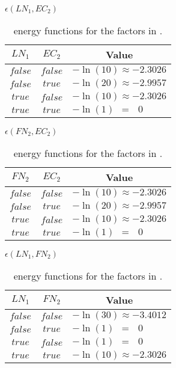 \begin{table}[t]
\begin{minipage}{0.5\linewidth}
\centering
$\epsilon(LN_1,EC_2)$\par
\smallskip
\begin{tabular}{c c l}
 \toprule
 $LN_1$ & $EC_2$ & \multicolumn{1}{c}{Value} \\
 \midrule
 $false$ & $false$ & $-\ln(10)\approx-2.3026$ \\
 $false$ & $true$ & $-\ln(20)\approx-2.9957$ \\
 $true$ & $false$ & $-\ln(10)\approx-2.3026$ \\
 $true$ & $true$ & $-\ln(1)\ \ =\ \ \ 0$ \\
 \bottomrule
\end{tabular}
\end{minipage}
\hfill
\begin{minipage}{0.5\linewidth}
\centering
$\epsilon(FN_2,EC_2)$\par
\smallskip
\begin{tabular}{c c l}
 \toprule
 $FN_2$ & $EC_2$ & \multicolumn{1}{c}{Value} \\
 \midrule
 $false$ & $false$ & $-\ln(10)\approx-2.3026$ \\
 $false$ & $true$ & $-\ln(20)\approx-2.9957$ \\
 $true$ & $false$ & $-\ln(10)\approx-2.3026$ \\
 $true$ & $true$ & $-\ln(1)\ \ = \ \ \ 0$ \\
 \bottomrule
\end{tabular}
\end{minipage}
\medskip
\begin{center}
$\epsilon(LN_1,FN_2)$\par
\smallskip
\begin{tabular}{c c l}
 \toprule
 $LN_1$ & $FN_2$ & \multicolumn{1}{c}{Value} \\
 \midrule
 $false$ & $false$ & $-\ln(30)\approx-3.4012$ \\
 $false$ & $true$ & $-\ln(1)\ \ =\ \ \ 0$ \\
 $true$ & $false$ & $-\ln(1)\ \ =\ \ \ 0$ \\
 $true$ & $true$ & $-\ln(10)\approx-2.3026$ \\
 \bottomrule
\end{tabular}
\end{center}

\caption{\Glspl{energy function} for the \glspl{factor} in .}
\label{tab:example-energy-functions}
\end{table}

